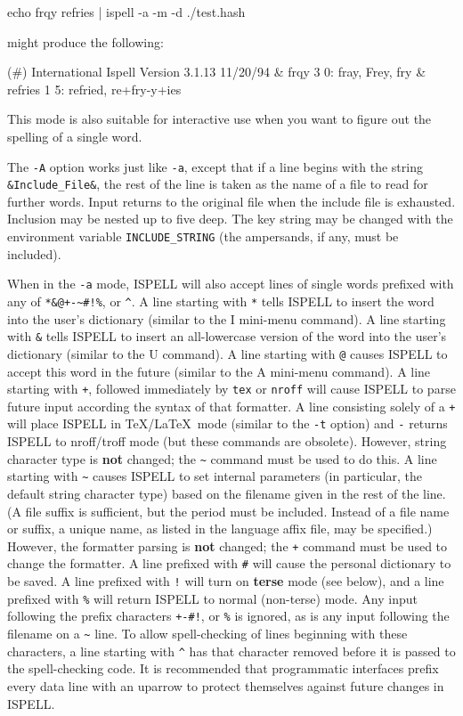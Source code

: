\documentclass[noabs,nolof,twoside,11pt]{starlink}
\begin{document}
\begin{itemize}
\begin{terminalv}
echo frqy refries | ispell -a -m -d ./test.hash
\end{terminalv}

might produce the following:

\begin{terminalv}
(#) International Ispell Version 3.1.13 11/20/94
& frqy 3 0: fray, Frey, fry
& refries 1 5: refried, re+fry-y+ies
\end{terminalv}

This mode is also suitable for interactive use when you want to figure out
the spelling of a single word.

The \verb+-A+ option works just like \verb+-a+, except that if a line begins
with the string \verb+&Include_File&+, the rest of the line is taken as the
name of a file to read for further words.
Input returns to the original file when the include file is exhausted.
Inclusion may be nested up to five deep.
The key string may be changed with the environment variable
\verb+INCLUDE_STRING+ (the ampersands, if any, must be included).

When in the \verb+-a+ mode, ISPELL will also accept lines of single words
prefixed with any of \verb=*&@+-~#!%=, or \verb+^+\@.
A line starting with \verb+*+ tells ISPELL to insert the word into the user's
dictionary (similar to the I mini-menu command).
A line starting with \verb+&+ tells ISPELL to insert an all-lowercase version
of the word into the user's dictionary (similar to the U command).
A line starting with \verb+@+ causes ISPELL to accept this word in the future
(similar to the A mini-menu command).
A line starting with \verb-+-, followed immediately by \verb+tex+ or
\verb+nroff+ will cause ISPELL to parse future input according the syntax of
that formatter.
A line consisting solely of a \verb-+- will place ISPELL in \TeX /\LaTeX\ mode
(similar to the \verb+-t+ option) and \verb+-+ returns ISPELL to nroff/troff
mode (but these commands are obsolete).
However, string character type is \textbf{not} changed; the \verb+~+ command
must be used to do this.
A line starting with \verb+~+ causes ISPELL to set internal parameters (in
particular, the default string character type) based on the filename given in
the rest of the line.
(A file suffix is sufficient, but the period must be included.
Instead of a file name or suffix, a unique name, as listed in the language
affix file, may be specified.)
However, the formatter parsing is \textbf{not} changed; the \verb-+- command must
be used to change the formatter.
A line prefixed with \verb+#+ will cause the personal dictionary to be saved.
A line prefixed with \verb+!+ will turn on \textbf{terse} mode (see below), and
a line prefixed with \verb+%+ will return ISPELL to normal (non-terse) mode.
Any input following the prefix characters \verb=+-#!=, or \verb+%+ is ignored,
as is any input following the filename on a \verb+~+ line.
To allow spell-checking of lines beginning with these characters, a line
starting with \verb+^+ has that character removed before it is passed to the
spell-checking code.
It is recommended that programmatic interfaces prefix every data line with an
uparrow to protect themselves against future changes in ISPELL\@.


\end{itemize}
\end{document}
